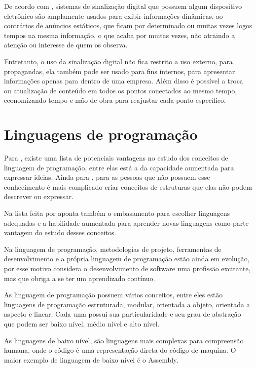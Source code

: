 De acordo com \cite{mishima2016}, sistemas de sinalização
digital que possuem algum dispositivo eletrônico são amplamente usados para exibir informações dinâmicas, ao contrários de anúncios estáticos, que ficam por determinado ou muitas vezes logos tempos na mesma informação, o que acaba por muitas vezes, não atraindo a atenção ou interesse de quem os observa.

Entretanto, o uso da sinalização digital não fica restrito a uso externo, para propagandas, ela também pode ser usado para fins internos, para apresentar informações apenas para dentro de uma empresa. Além disso é possível a troca ou atualização de conteúdo em todos os pontos conectados ao mesmo tempo, economizando tempo e mão de obra para reajustar cada ponto específico.

\section{Linguagens de programação}
Para \cite{sebesta2011}, existe uma lista de potenciais vantagens no estudo dos conceitos de linguagem de programação, entre elas está a da capacidade aumentada para expressar ideias. Ainda para \cite{sebesta2011}, para as pessoas que não possuem esse conhecimento é mais complicado criar conceitos de estruturas que elas não podem descrever ou expressar. 

Na lista feita por \cite{sebesta2011} aponta também o embasamento para escolher linguagens adequadas e a habilidade aumentada para aprender novas linguagens como parte vantagem do estudo desses conceitos.

Na linguagem de programação, metodologias de projeto, ferramentas de desenvolvimento e a própria linguagem de programação estão ainda em evolução, por esse motivo \cite{sebesta2011} considera o desenvolvimento de software uma profissão excitante, mas que obriga a se ter um aprendizado contínuo.

As linguagem de programação possuem vários conceitos, entre eles estão linguagens de programação estruturada, modular, orientada a objeto, orientada a aspecto e linear. Cada uma possui sua particularidade e seu grau de abstração que podem ser baixo nível, médio nível e alto nível.


As linguagens de baixo nível, são linguagens mais complexas para compreensão humana, onde o código é uma representação direta do código de maquina. O maior exemplo de linguagem de baixo nível é o Assembly.


